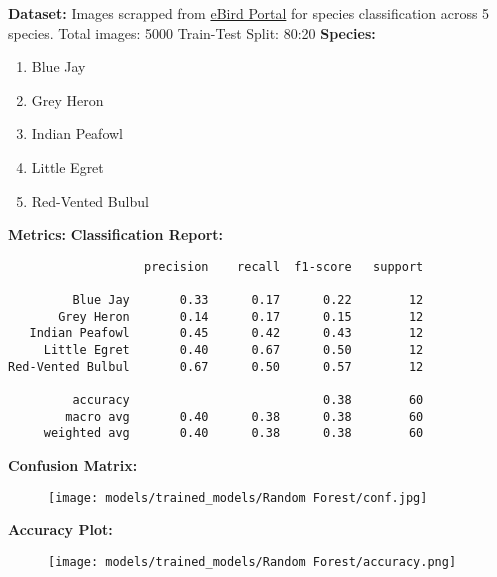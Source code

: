 \documentclass{article}
\begin{document}
\noindent \textbf{Dataset:}
Images scrapped from \href{https://ebird.org/explore}{eBird Portal}  for species classification across 5 species.
\newline
Total images: 5000
\newline
Train-Test Split: 80:20
\newline
\newline
\noindent \textbf{Species:}
\begin{enumerate}[noitemsep]
  \item Blue Jay
  \item Grey Heron
  \item Indian Peafowl
  \item Little Egret
  \item Red-Vented Bulbul
\end{enumerate}
\vspace{5mm}
\noindent \textbf{Metrics:}
\newline
\newline
\noindent \textbf{Classification Report:}

\begin{verbatim}                   precision    recall  f1-score   support

         Blue Jay       0.33      0.17      0.22        12
       Grey Heron       0.14      0.17      0.15        12
   Indian Peafowl       0.45      0.42      0.43        12
     Little Egret       0.40      0.67      0.50        12
Red-Vented Bulbul       0.67      0.50      0.57        12

         accuracy                           0.38        60
        macro avg       0.40      0.38      0.38        60
     weighted avg       0.40      0.38      0.38        60
\end{verbatim}
\newpage
\noindent \textbf{Confusion Matrix:}

\begin{figure}[h!]
\centering
\texttt{[image: models/trained\_models/Random Forest/conf.jpg]}
\end{figure}
\noindent \textbf{Accuracy Plot:}
\begin{figure}[h!]
\centering
\texttt{[image: models/trained\_models/Random Forest/accuracy.png]}
\end{figure}
\end{document}
